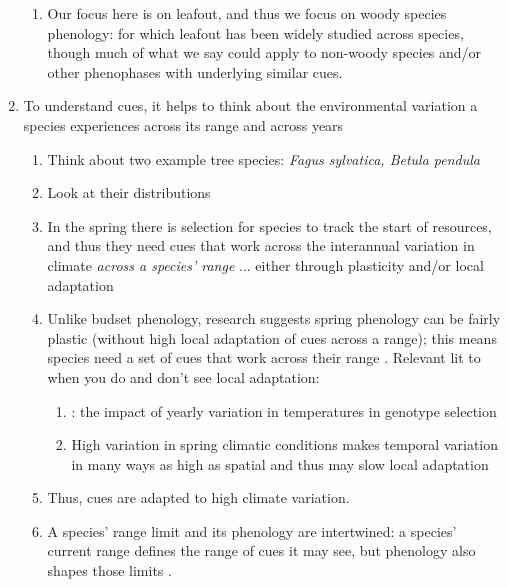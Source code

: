 \documentclass[11pt,letterpaper]{article}
\begin{document}
\begin{enumerate}
\begin{enumerate}
\item Our focus here is on leafout, and thus we focus on woody species phenology: for which leafout has been widely studied across species, though much of what we say could apply to non-woody species and/or other phenophases with underlying similar cues. 
\end{enumerate}
\item To understand cues, it helps to think about the environmental variation a species experiences across its range and across years
\begin{enumerate}
\item Think about two example tree species: \emph{Fagus sylvatica, Betula pendula}
\item Look at their distributions
\item In the spring there is selection for species to track the start of resources, and thus they need cues that work across the interannual variation in climate \emph{across a species' range} ... either through plasticity and/or local adaptation
\item Unlike budset phenology, research suggests spring phenology can be fairly plastic (without high local adaptation of cues across a range); this means species need a set of cues that work across their range \citep{liepe2016}. Relevant lit to when you do and don't see local adaptation:
\begin{enumerate}
\item \citet{kelly2003}: the impact of yearly variation in temperatures in genotype selection %
\item High variation in spring climatic conditions makes temporal variation in many ways as high as spatial and thus may slow local adaptation \citep[see also ][]{legave2013}
\end{enumerate}
\item Thus, cues are adapted to high climate variation.
\item A species' range limit and its phenology are intertwined: a species' current range defines the range of cues it may see, but phenology also shapes those limits \citep{morin2007,Morin:2008vp}.

\end{enumerate}
\end{enumerate}
\end{document}
